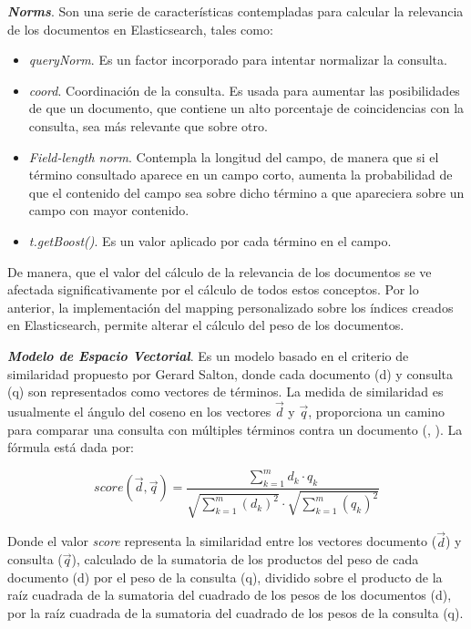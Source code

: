 \textit{\textbf{Norms}}. Son una serie de características contempladas para calcular la relevancia de los documentos en Elasticsearch, tales como:
\begin{itemize}
  \item \textit{queryNorm}. Es un factor incorporado para intentar normalizar la consulta.
  \item \textit{coord}. Coordinación de la consulta. Es usada para aumentar las posibilidades de que un documento, que contiene un alto porcentaje de coincidencias con la consulta, sea más relevante que sobre otro.
  \item \textit{Field-length norm}. Contempla la longitud del campo, de manera que si el término consultado aparece en un campo corto, aumenta la probabilidad de que el contenido del campo sea sobre dicho término a que apareciera sobre un campo con mayor contenido.
  \item \textit{t.getBoost()}. Es un valor aplicado por cada término en el campo.
  
\end{itemize}

De manera, que el valor del cálculo de la relevancia de los documentos se ve afectada significativamente por el cálculo de todos estos conceptos. Por lo anterior, la implementación del mapping personalizado sobre los índices creados en Elasticsearch, permite alterar el cálculo del peso de los documentos. 

\textit{\textbf{Modelo de Espacio Vectorial}}.
Es un modelo basado en el criterio de similaridad propuesto por Gerard Salton, donde cada documento (d) y consulta (q) son representados como vectores de términos. La medida de similaridad es usualmente el ángulo del coseno en los vectores $\vec{d}$ y $\vec{q}$, proporciona un camino para comparar una consulta con múltiples términos contra un documento (\citeauthor{modelos_recuperacion_info}, \citeyear{modelos_recuperacion_info}). La fórmula está dada por: 

\begin{equation}\label{eq:Fórmula tf/idf}
score( \vec{d}, \vec{q}) = \frac{\sum_{k=1}^m {d_k}\cdot{q_k} } { \sqrt{\sum_{k=1}^m (d_k)^2} \cdot \sqrt{\sum_{k=1}^m (q_k)^2}}
\end{equation}
 
Donde el valor \textit{score} representa la similaridad entre los vectores documento ($\vec{d}$) y consulta ($\vec{q}$), calculado de la sumatoria de los productos del peso de cada documento (d) por el peso de la consulta (q), dividido sobre el producto de la raíz cuadrada de la sumatoria del cuadrado de los pesos de los documentos (d), por la raíz cuadrada de la sumatoria del cuadrado de los pesos de la consulta (q).


